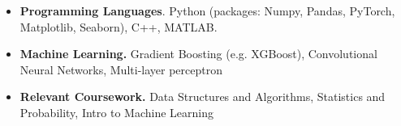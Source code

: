 

\begin{cvparagraph}

\begin{itemize}[leftmargin=*, noitemsep]
    \item \textbf{Programming Languages}. Python (packages: Numpy, Pandas, PyTorch, Matplotlib, Seaborn), C++, MATLAB.
    \item \textbf{Machine Learning.} Gradient Boosting (e.g. XGBoost), Convolutional Neural Networks, Multi-layer perceptron
    \item \textbf{Relevant Coursework.} Data Structures and Algorithms, Statistics and Probability, Intro to Machine Learning
\end{itemize}

\end{cvparagraph}
